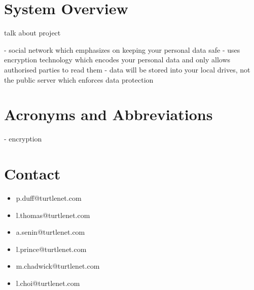 \section{System Overview}
talk about project

- social network which emphasizes on keeping your personal data safe
- uses encryption technology which encodes your personal data and only allows authorised parties to read them
- data will be stored into your local drives, not the public server which enforces data protection

\section{Acronyms and Abbreviations}
- encryption

\section{Contact}


\begin{itemize}
\item p.duff@turtlenet.com
\item l.thomas@turtlenet.com
\item a.senin@turtlenet.com
\item l.prince@turtlenet.com
\item m.chadwick@turtlenet.com
\item l.choi@turtlenet.com
\end{itemize}